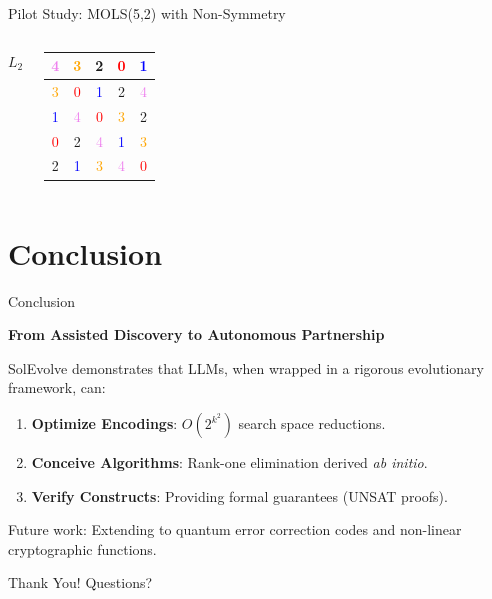 \documentclass[10pt, aspectratio=169]{beamer}
\begin{document}
\begin{frame}{Pilot Study: MOLS(5,2) with Non-Symmetry}
\begin{columns}
        \vspace{0.2cm}
        \textbf{$L_2$} \quad
        \begin{tabular}{|c|c|c|c|c|}
        \hline
         \textcolor{violet}{4} & \textcolor{orange}{3} & \textcolor{green!60!black}{2} & \textcolor{red}{0} & \textcolor{blue}{1} \\ \hline
         \textcolor{orange}{3} & \textcolor{red}{0} & \textcolor{blue}{1} & \textcolor{green!60!black}{2} & \textcolor{violet}{4} \\ \hline
         \textcolor{blue}{1} & \textcolor{violet}{4} & \textcolor{red}{0} & \textcolor{orange}{3} & \textcolor{green!60!black}{2} \\ \hline
         \textcolor{red}{0} & \textcolor{green!60!black}{2} & \textcolor{violet}{4} & \textcolor{blue}{1} & \textcolor{orange}{3} \\ \hline
         \textcolor{green!60!black}{2} & \textcolor{blue}{1} & \textcolor{orange}{3} & \textcolor{violet}{4} & \textcolor{red}{0} \\ \hline
        \end{tabular}
    \end{columns}
\end{frame}

\section{Conclusion}

\begin{frame}{Conclusion}
    \begin{center}
        \Large \textbf{From Assisted Discovery to Autonomous Partnership}
    \end{center}
    \vspace{0.5cm}
    SolEvolve demonstrates that LLMs, when wrapped in a rigorous evolutionary framework, can:
    \begin{enumerate}
        \item \textbf{Optimize Encodings}: $O(2^{k^2})$ search space reductions.
        \item \textbf{Conceive Algorithms}: Rank-one elimination derived \textit{ab initio}.
        \item \textbf{Verify Constructs}: Providing formal guarantees (UNSAT proofs).
    \end{enumerate}
    \vspace{0.5cm}
    \begin{block}{}
        \centering
        Future work: Extending to quantum error correction codes and non-linear cryptographic functions.
    \end{block}
\end{frame}

\begin{frame}[standout]
    \Huge Thank You!
    \vspace{0.5cm} 
    \normalsize
    Questions?
\end{frame}

\appendix
\end{document}
